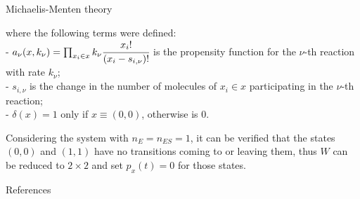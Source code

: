 \documentclass[final]{beamer}
\newlength{\colwidth}
\begin{document}
\begin{frame}[t]
\begin{columns}[t]
\begin{column}{\colwidth}
\begin{block}{Michaelis-Menten theory}
\begin{itemize}
\begin{equation*}
\end{equation*}
\vskip-20pt
where the following terms were defined:\\
- $a_\nu({x},k_\nu) = \prod_{x_i \in x} k_\nu \cfrac{{x_i}!}{({x}_{i} - s_{i,\nu})!}$ is the propensity function for the $\nu$-th reaction with rate $k_\nu$;\\
- $s_{i,\nu} $ is the change in the number of molecules of $x_i \in x$ participating in the $\nu$-th reaction;\\
- $\delta(x) = 1$ only if $x \equiv (0,0)$, otherwise is $0$.
%
\end{itemize}
%

Considering the system with $n_E=n_{ES}=1$, it can be verified that the states $(0,0)$ and $(1,1)$ have no transitions coming to or leaving them, thus $W$ can be reduced to $2 \times 2$ and set $p_x(t) = 0$ for those states. 
\end{block}


\begin{alertblock}{References}

\footnotesize{}


\end{alertblock}
\end{column}
\end{columns}
\end{frame}
\end{document}
